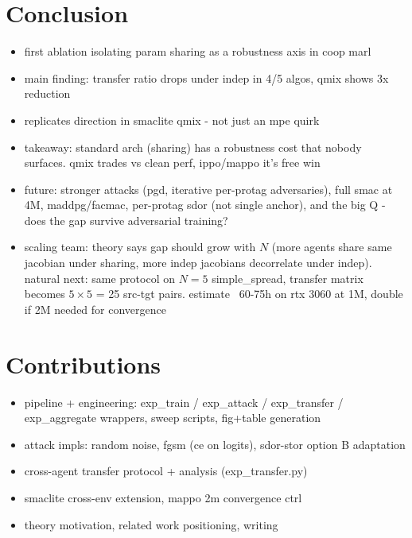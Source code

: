 \documentclass{article}
\begin{document}
\section{Conclusion}

\begin{itemize}
  \item first ablation isolating param sharing as a robustness axis in coop marl
  \item main finding: transfer ratio drops under indep in 4/5 algos, qmix shows 3x reduction
  \item replicates direction in smaclite qmix - not just an mpe quirk
  \item takeaway: standard arch (sharing) has a robustness cost that nobody surfaces. qmix trades vs clean perf, ippo/mappo it's free win
  \item future: stronger attacks (pgd, iterative per-protag adversaries), full smac at 4M, maddpg/facmac, per-protag sdor (not single anchor), and the big Q - does the gap survive adversarial training?
  \item scaling team: theory says gap should grow with $N$ (more agents share same jacobian under sharing, more indep jacobians decorrelate under indep). natural next: same protocol on $N=5$ simple\_spread, transfer matrix becomes $5\times 5$ = 25 src-tgt pairs. estimate ~60-75h on rtx 3060 at 1M, double if 2M needed for convergence
\end{itemize}

\section{Contributions}
\begin{itemize}
  \item pipeline + engineering: exp\_train / exp\_attack / exp\_transfer / exp\_aggregate wrappers, sweep scripts, fig+table generation
  \item attack impls: random noise, fgsm (ce on logits), sdor-stor option B adaptation
  \item cross-agent transfer protocol + analysis (exp\_transfer.py)
  \item smaclite cross-env extension, mappo 2m convergence ctrl
  \item theory motivation, related work positioning, writing
\end{itemize}
\end{document}

